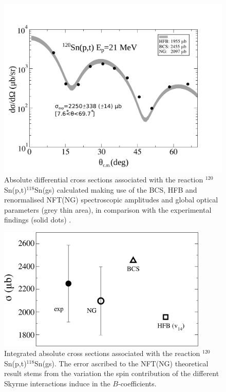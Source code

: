  \begin{figure}
  \centerline{\includegraphics*[width=12cm,angle=0]{C8/figsC8/Fig2_v2}}
  	\caption{Absolute differential  cross sections associated with the reaction
  	$^{120}$Sn(p,t)$^{118}$Sn(gs) calculated making use of the BCS, HFB and renormalised NFT(NG) spectroscopic 
  	amplitudes and global optical parameters (grey thin area), in comparison with the experimental findings (solid dots) \cite{Guazzoni:08}.  
  }\label{fig6.4.2}
  \end{figure}
  \begin{figure}
  \centerline{\includegraphics*[width=10cm,angle=0]{C8/figsC8/fig5_v2}}
  	\caption{Integrated absolute  cross sections associated with the reaction
  	$^{120}$Sn(p,t)$^{118}$Sn(gs). The error ascribed  to
  	the NFT(NG) theoretical result stems from the variation the spin contribution of the different Skyrme interactions induce in the $B$-coefficients. }\label{fig6.4.3}
  \end{figure}
  



